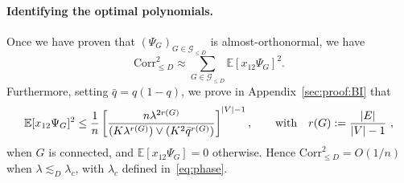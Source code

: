 \documentclass[final]{colt2026}
\newcommand{\1}{\mathbf{1}}
\newcommand{\ch}[1]{\textcolor{green}{#1}}
\newcommand{\bbE}{\mathbb{E}}
\newcommand{\pa}[1]{\left(#1\right)}
\begin{document}
\paragraph{Identifying the optimal polynomials.}
Once we have proven that $(\Psi_{G})_{G\in \mathcal{G}_{\leq D}}$ is almost-orthonormal, we have
$$\mathrm{Corr}^2_{\leq D} \approx \sum_{G\in \mathcal{G}_{\leq D}} \mathbb{E}[x_{12}\Psi_G]^2.$$
Furthermore, setting $\bar q=q(1-q)$, we prove in Appendix~\ref{sec:proof:BI} that 
\begin{equation}\label{eq:optimalG}
 \mathbb E[x_{12}\Psi_G]^2     \leq   \frac{1}{n}\left[\frac{n \lambda^{2r(G)}}{(K\lambda^{r(G)}) \vee (K^2 \bar q^{r(G)})}\right]^{|V|-1},\qquad\text{with}\quad r(G):={|E|\over |V|-1}\ ,
\end{equation}
when $G$ is connected, and $\bbE[x_{12}\Psi_G]=0$ otherwise. 
Hence $\mathrm{Corr}^2_{\leq D}=O(1/n)$ when $\lambda \lesssim_{D} \lambda_{c}$, with $\lambda_{c}$ defined in~\eqref{eq:phase}.


\end{document}
